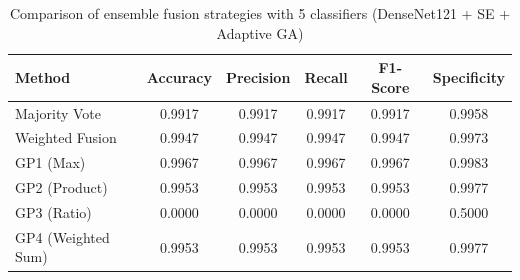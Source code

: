 \begin{table}[htbp]
\centering
\caption{Comparison of ensemble fusion strategies with 5 classifiers (DenseNet121 + SE + Adaptive GA)}
\label{tab:table15}
\begin{tabular}{lccccc}
\toprule
Method & Accuracy & Precision & Recall & F1-Score & Specificity \\
\midrule
Majority Vote & 0.9917 & 0.9917 & 0.9917 & 0.9917 & 0.9958 \\
Weighted Fusion & 0.9947 & 0.9947 & 0.9947 & 0.9947 & 0.9973 \\
GP1 (Max) & 0.9967 & 0.9967 & 0.9967 & 0.9967 & 0.9983 \\
GP2 (Product) & 0.9953 & 0.9953 & 0.9953 & 0.9953 & 0.9977 \\
GP3 (Ratio) & 0.0000 & 0.0000 & 0.0000 & 0.0000 & 0.5000 \\
GP4 (Weighted Sum) & 0.9953 & 0.9953 & 0.9953 & 0.9953 & 0.9977 \\
\bottomrule
\end{tabular}
\end{table}